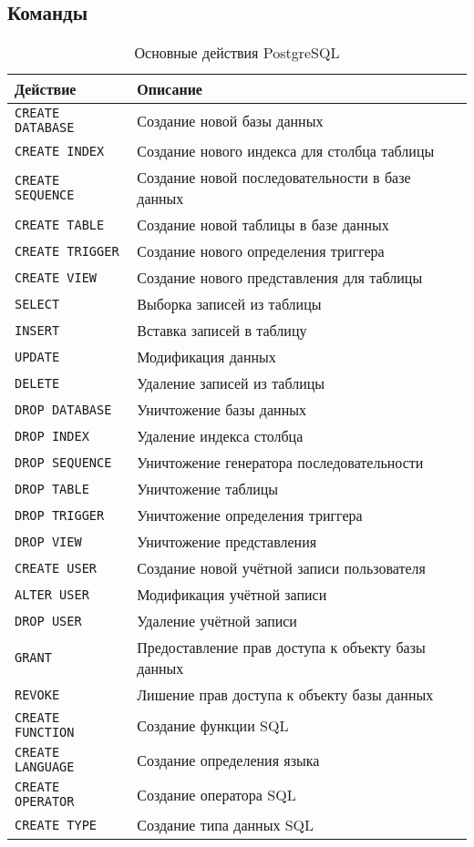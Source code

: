 \documentclass[a4paper,12pt,notitlepage,headsepline,pdftex]{scrartcl}
\begin{document}
  \subsection{Команды}
    \begin{table}[h]
      \centering
      \caption{Основные действия PostgreSQL}\label{tab:commands}
      \begin{tabular}[c]{l|l}
        \hline
        \textbf{Действие} & \textbf{Описание}\\
        \hline
        \texttt{CREATE DATABASE} & Создание новой базы данных\\
        \texttt{CREATE INDEX} & Создание нового индекса для столбца таблицы\\
        \texttt{CREATE SEQUENCE} & Создание новой последовательности в базе
                                  данных\\
        \texttt{CREATE TABLE} & Создание новой таблицы в базе данных\\
        \texttt{CREATE TRIGGER} & Создание нового определения триггера\\
        \texttt{CREATE VIEW} & Создание нового представления для таблицы\\
        \texttt{SELECT} & Выборка записей из таблицы\\
        \texttt{INSERT} & Вставка записей в таблицу\\
        \texttt{UPDATE} & Модификация данных\\
        \texttt{DELETE} & Удаление записей из таблицы\\
        \texttt{DROP DATABASE} & Уничтожение базы данных\\
        \texttt{DROP INDEX} & Удаление индекса столбца\\
        \texttt{DROP SEQUENCE} & Уничтожение генератора последовательности\\
        \texttt{DROP TABLE} & Уничтожение таблицы\\
        \texttt{DROP TRIGGER} & Уничтожение определения триггера\\
        \texttt{DROP VIEW} & Уничтожение представления\\
        \texttt{CREATE USER} & Создание новой учётной записи пользователя\\
        \texttt{ALTER USER} & Модификация учётной записи\\
        \texttt{DROP USER} & Удаление учётной записи\\
        \texttt{GRANT} & Предоставление прав доступа к объекту базы данных\\
        \texttt{REVOKE} & Лишение прав доступа к объекту базы данных\\
        \texttt{CREATE FUNCTION} & Создание функции SQL\\
        \texttt{CREATE LANGUAGE} & Создание определения языка\\
        \texttt{CREATE OPERATOR} & Создание оператора SQL\\
        \texttt{CREATE TYPE} & Создание типа данных SQL\\
        \hline
      \end{tabular}
    \end{table}
\end{document}
